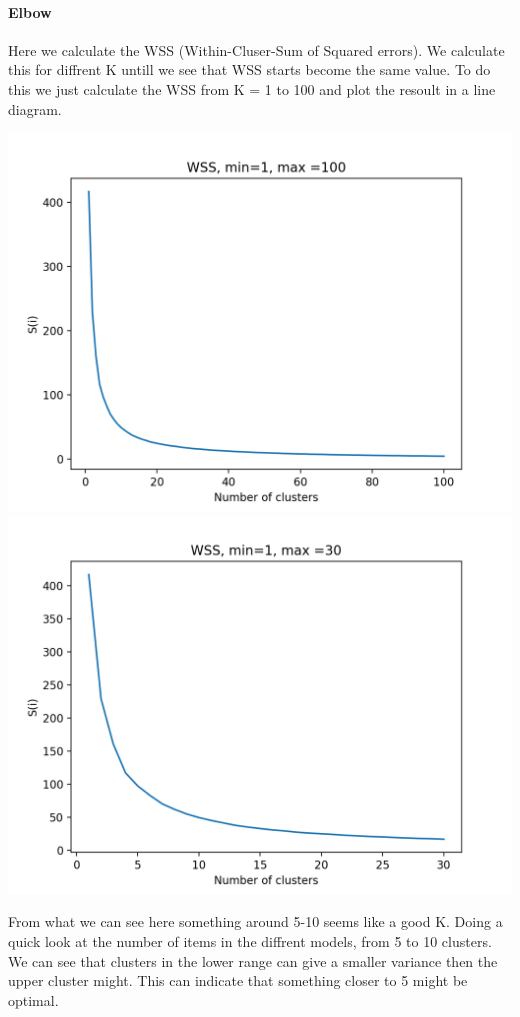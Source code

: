 \documentclass[10pt]{article}
\begin{document}
    \paragraph{Elbow}
    Here we calculate the WSS (Within-Cluser-Sum of Squared errors). We calculate this for diffrent K untill we see that WSS starts become the same value. To do this we just calculate the WSS from K = 1 to 100 and plot the resoult in a line diagram.

    \includegraphics[scale=0.35]{wss_line_100.png}
    \includegraphics[scale=0.35]{wss_line_30.png}

    From what we can see here something around 5-10 seems like a good K. Doing a quick look at the number of items in the diffrent models, from 5 to 10 clusters. We can see that clusters in the lower range can give a smaller variance then the upper cluster might. This can indicate that something closer to 5 might be optimal.
\end{document}
